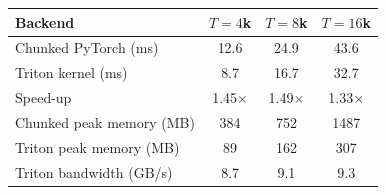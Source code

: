\begin{tabular}{lccc}
\toprule
Backend & $T=4$k & $T=8$k & $T=16$k \\
\midrule
Chunked PyTorch (ms) & 12.6 & 24.9 & 43.6 \\
Triton kernel (ms) & 8.7 & 16.7 & 32.7 \\
Speed-up & 1.45$\times$ & 1.49$\times$ & 1.33$\times$ \\
Chunked peak memory (MB) & 384 & 752 & 1487 \\
Triton peak memory (MB) & 89 & 162 & 307 \\
Triton bandwidth (GB/s) & 8.7 & 9.1 & 9.3 \\
\bottomrule
\end{tabular}
